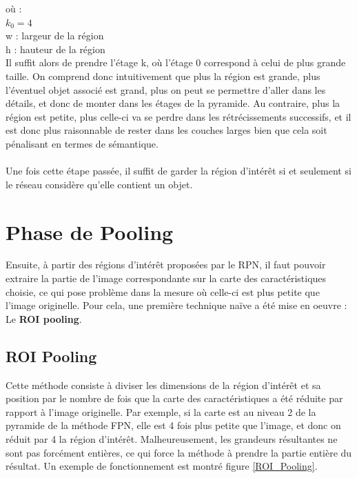 où :\\
$k_0 = 4$\\
w : largeur de la région\\
h : hauteur de la région\\

Il suffit alors de prendre l'étage k, où l'étage 0 correspond à celui de plus grande taille. On comprend donc intuitivement que plus la région est grande, plus l'éventuel objet associé est grand, plus on peut se permettre d'aller dans les détails, et donc de monter dans les étages de la pyramide. Au contraire, plus la région est petite, plus celle-ci va se perdre dans les rétrécissements successifs, et il est donc plus raisonnable de rester dans les couches larges bien que cela soit pénalisant en termes de sémantique.\\
\\
Une fois cette étape passée, il suffit de garder la région d'intérêt si et seulement si le réseau considère qu'elle contient un objet.

\section{Phase de Pooling}

Ensuite, à partir des régions d'intérêt proposées par le RPN, il faut pouvoir extraire la partie de l'image correspondante sur la carte des caractéristiques choisie, ce qui pose problème dans la mesure où celle-ci est plus petite que l'image originelle. Pour cela, une première technique naïve a été mise en oeuvre : Le \textbf{ROI pooling}. 

\subsection{ROI Pooling}

Cette méthode consiste à diviser les dimensions de la région d'intérêt  et sa position par le nombre de fois que la carte des caractéristiques   a été réduite par rapport à l'image originelle. Par exemple, si la carte est au niveau 2 de la pyramide de la méthode FPN, elle est 4 fois plus petite que l'image, et donc on réduit par 4 la région d'intérêt. Malheureusement, les grandeurs résultantes ne sont pas forcément entières, ce qui force la méthode à prendre la partie entière du résultat. Un exemple de fonctionnement est montré figure \ref{ROI_Pooling}.

